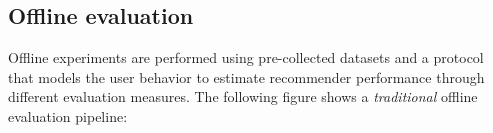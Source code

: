 %
%
%

\subsection{Offline evaluation}

Offline experiments are performed using pre-collected datasets and a protocol
that models the user behavior to estimate recommender performance through
different evaluation measures. The following figure shows a \emph{traditional}
offline evaluation pipeline:

